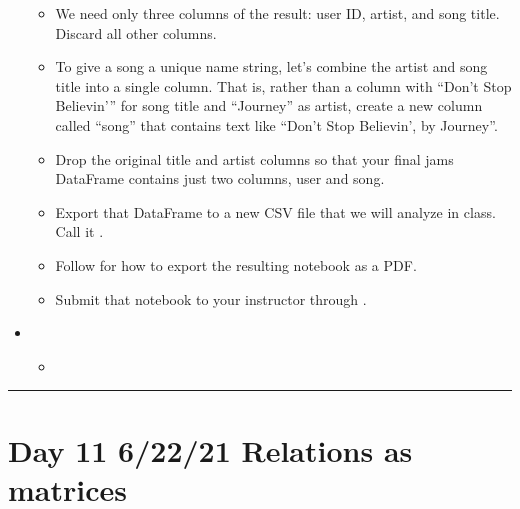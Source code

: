 \documentclass[letterpaper,10pt,english]{jupyterBook}
\begin{document}
\begin{itemize}
\begin{itemize}
\item {} 
\sphinxAtStartPar
We need only three columns of the result: user ID, artist, and song title.  Discard all other columns.

\item {} 
\sphinxAtStartPar
To give a song a unique name string, let’s combine the artist and song title into a single column.  That is, rather than a column with “Don’t Stop Believin’” for song title and “Journey” as artist, create a new column called “song” that contains text like “Don’t Stop Believin’, by Journey”.

\item {} 
\sphinxAtStartPar
Drop the original title and artist columns so that your final jams DataFrame contains just two columns, user and song.

\item {} 
\sphinxAtStartPar
Export that DataFrame to a new CSV file that we will analyze in class.  Call it .

\item {} 
\sphinxAtStartPar
Follow  for how to export the resulting notebook as a PDF.

\item {} 
\sphinxAtStartPar
Submit that notebook to your instructor through .

\end{itemize}

\item {} 
\sphinxAtStartPar
{}
\begin{itemize}
\item {} 
\sphinxAtStartPar
{\hyperref[\detokenize{chapter-16-matrices::doc}]{}}

\end{itemize}

\end{itemize}


\bigskip\hrule\bigskip



\section{Day 11 \sphinxhyphen{} 6/22/21 \sphinxhyphen{} Relations as matrices}
\label{\detokenize{course-schedule:day-11-6-22-21-relations-as-matrices}}
\end{document}
